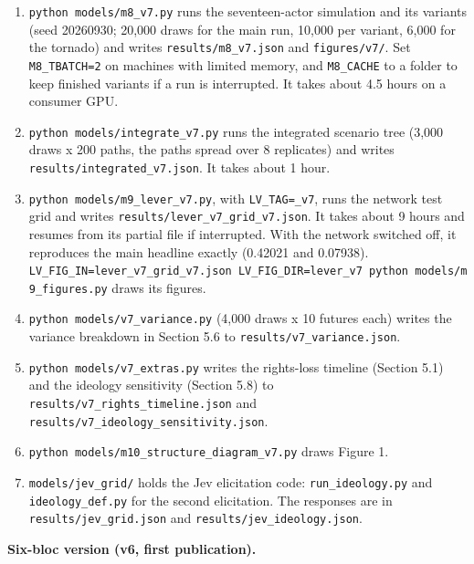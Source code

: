 \documentclass[
  10pt,
]{article}
\providecommand{\tightlist}{%
  \setlength{\itemsep}{0pt}\setlength{\parskip}{0pt}}
\begin{document}
\begin{enumerate}
\def\labelenumi{\arabic{enumi}.}
\tightlist
\item
  \texttt{python\ models/m8\_v7.py} runs the seventeen-actor simulation and its variants (seed
  20260930; 20,000 draws for the main run, 10,000 per variant, 6,000 for the tornado) and writes
  \texttt{results/m8\_v7.json} and \texttt{figures/v7/}. Set \texttt{M8\_TBATCH=2} on machines with
  limited memory, and \texttt{M8\_CACHE} to a folder to keep finished variants if a run is
  interrupted. It takes about 4.5 hours on a consumer GPU.
\item
  \texttt{python\ models/integrate\_v7.py} runs the integrated scenario tree (3,000 draws x 200
  paths, the paths spread over 8 replicates) and writes \texttt{results/integrated\_v7.json}. It
  takes about 1 hour.
\item
  \texttt{python\ models/m9\_lever\_v7.py}, with \texttt{LV\_TAG=\_v7}, runs the network test grid
  and writes \texttt{results/lever\_v7\_grid\_v7.json}. It takes about 9 hours and resumes from its
  partial file if interrupted. With the network switched off, it reproduces the main headline
  exactly (0.42021 and 0.07938).
  \texttt{LV\_FIG\_IN=lever\_v7\_grid\_v7.json\ LV\_FIG\_DIR=lever\_v7\ python\ models/m9\_figures.py}
  draws its figures.
\item
  \texttt{python\ models/v7\_variance.py} (4,000 draws x 10 futures each) writes the variance
  breakdown in Section 5.6 to \texttt{results/v7\_variance.json}.
\item
  \texttt{python\ models/v7\_extras.py} writes the rights-loss timeline (Section 5.1) and the
  ideology sensitivity (Section 5.8) to \texttt{results/v7\_rights\_timeline.json} and
  \texttt{results/v7\_ideology\_sensitivity.json}.
\item
  \texttt{python\ models/m10\_structure\_diagram\_v7.py} draws Figure 1.
\item
  \texttt{models/jev\_grid/} holds the Jev elicitation code: \texttt{run\_ideology.py} and
  \texttt{ideology\_def.py} for the second elicitation. The responses are in
  \texttt{results/jev\_grid.json} and \texttt{results/jev\_ideology.json}.
\end{enumerate}

\textbf{Six-bloc version (v6, first publication).}
\end{document}
